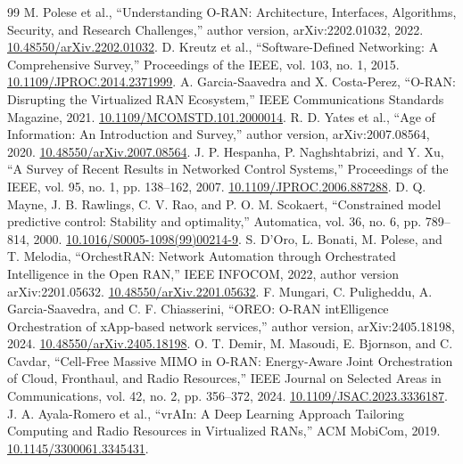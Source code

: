 \documentclass[10pt,a4paper]{article}
\begin{document}
\small\begin{thebibliography}{99}\setlength{\itemsep}{2pt}
 M. Polese et al., ``Understanding O-RAN: Architecture, Interfaces, Algorithms, Security, and Research Challenges,'' author version, arXiv:2202.01032, 2022. \href{https://doi.org/10.48550/arXiv.2202.01032}{10.48550/arXiv.2202.01032}.
 D. Kreutz et al., ``Software-Defined Networking: A Comprehensive Survey,'' Proceedings of the IEEE, vol. 103, no. 1, 2015. \href{https://doi.org/10.1109/JPROC.2014.2371999}{10.1109/JPROC.2014.2371999}.
 A. Garcia-Saavedra and X. Costa-Perez, ``O-RAN: Disrupting the Virtualized RAN Ecosystem,'' IEEE Communications Standards Magazine, 2021. \href{https://doi.org/10.1109/MCOMSTD.101.2000014}{10.1109/MCOMSTD.101.2000014}.
 R. D. Yates et al., ``Age of Information: An Introduction and Survey,'' author version, arXiv:2007.08564, 2020. \href{https://doi.org/10.48550/arXiv.2007.08564}{10.48550/arXiv.2007.08564}.
 J. P. Hespanha, P. Naghshtabrizi, and Y. Xu, ``A Survey of Recent Results in Networked Control Systems,'' Proceedings of the IEEE, vol. 95, no. 1, pp. 138--162, 2007. \href{https://doi.org/10.1109/JPROC.2006.887288}{10.1109/JPROC.2006.887288}.
 D. Q. Mayne, J. B. Rawlings, C. V. Rao, and P. O. M. Scokaert, ``Constrained model predictive control: Stability and optimality,'' Automatica, vol. 36, no. 6, pp. 789--814, 2000. \href{https://doi.org/10.1016/S0005-1098(99)00214-9}{10.1016/S0005-1098(99)00214-9}.
 S. D'Oro, L. Bonati, M. Polese, and T. Melodia, ``OrchestRAN: Network Automation through Orchestrated Intelligence in the Open RAN,'' IEEE INFOCOM, 2022, author version arXiv:2201.05632. \href{https://doi.org/10.48550/arXiv.2201.05632}{10.48550/arXiv.2201.05632}.
 F. Mungari, C. Puligheddu, A. Garcia-Saavedra, and C. F. Chiasserini, ``OREO: O-RAN intElligence Orchestration of xApp-based network services,'' author version, arXiv:2405.18198, 2024. \href{https://doi.org/10.48550/arXiv.2405.18198}{10.48550/arXiv.2405.18198}.
 O. T. Demir, M. Masoudi, E. Bjornson, and C. Cavdar, ``Cell-Free Massive MIMO in O-RAN: Energy-Aware Joint Orchestration of Cloud, Fronthaul, and Radio Resources,'' IEEE Journal on Selected Areas in Communications, vol. 42, no. 2, pp. 356--372, 2024. \href{https://doi.org/10.1109/JSAC.2023.3336187}{10.1109/JSAC.2023.3336187}.
 J. A. Ayala-Romero et al., ``vrAIn: A Deep Learning Approach Tailoring Computing and Radio Resources in Virtualized RANs,'' ACM MobiCom, 2019. \href{https://doi.org/10.1145/3300061.3345431}{10.1145/3300061.3345431}.

\end{thebibliography}
\end{document}
